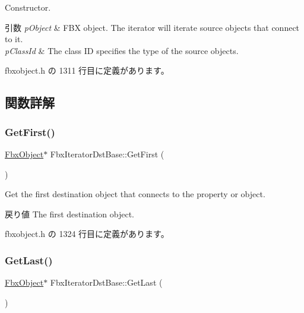 Constructor. 
\begin{DoxyParams}{引数}
{\em p\+Object} & F\+BX object. The iterator will iterate source objects that connect to it. \\
\hline
{\em p\+Class\+Id} & The class ID specifies the type of the source objects. \\
\hline
\end{DoxyParams}


 fbxobject.\+h の 1311 行目に定義があります。



\subsection{関数詳解}
\mbox{\label{class_fbx_iterator_dst_base_a52413f0e25a78503bbd1add8a30fec80}} 
\subsubsection{\texorpdfstring{Get\+First()}{GetFirst()}}
{\footnotesize\ttfamily \hyperlink{class_fbx_object}{Fbx\+Object}$\ast$ Fbx\+Iterator\+Dst\+Base\+::\+Get\+First (\begin{DoxyParamCaption}{ }\end{DoxyParamCaption})\hspace{0.3cm}{\ttfamily [inline]}}

Get the first destination object that connects to the property or object. \begin{DoxyReturn}{戻り値}
The first destination object. 
\end{DoxyReturn}


 fbxobject.\+h の 1324 行目に定義があります。

\mbox{\label{class_fbx_iterator_dst_base_a36f14606800603afb3106369d8dec485}} 
\subsubsection{\texorpdfstring{Get\+Last()}{GetLast()}}
{\footnotesize\ttfamily \hyperlink{class_fbx_object}{Fbx\+Object}$\ast$ Fbx\+Iterator\+Dst\+Base\+::\+Get\+Last (\begin{DoxyParamCaption}{ }\end{DoxyParamCaption})\hspace{0.3cm}{\ttfamily [inline]}}

